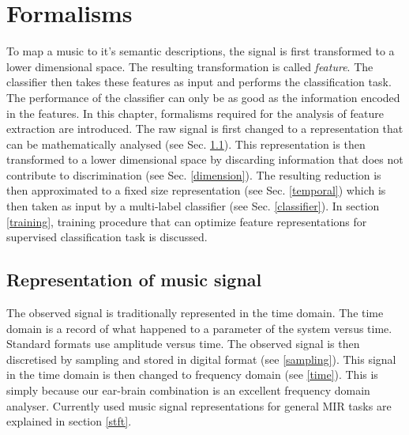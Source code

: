 





\chapter{Formalisms} %

\label{Chapter2} %



To map a music to it's semantic descriptions, the signal is first transformed to a lower dimensional space. The resulting transformation is called \textit{feature}. The classifier then takes these features as input and performs the classification task. The performance of the classifier can only be as good as the information encoded in the features. In this chapter, formalisms required for the analysis of feature extraction are introduced. The raw signal is first changed to a representation that can be mathematically analysed (see Sec. \ref{rep}). This representation is then transformed to a lower dimensional space by discarding information that does not contribute to discrimination (see Sec. \ref{dimension}). The resulting reduction is then approximated to a fixed size representation (see Sec. \ref{temporal}) which is then taken as input by a multi-label classifier (see Sec. \ref{classifier}). In section \ref{training}, training procedure that can optimize feature representations for supervised classification task is discussed. 

\section{Representation of music signal}
\label{rep}
The observed signal is traditionally represented in the time domain. The time domain is a record of what happened to a parameter of the system versus time. Standard formats use amplitude versus time. The observed signal is then discretised by sampling and stored in digital format (see \ref{sampling}). This signal in the time domain is then changed to frequency domain (see \ref{time}). This is simply because our ear-brain combination is an excellent frequency domain analyser. Currently used music signal representations for general MIR tasks are explained in section \ref{stft}.


